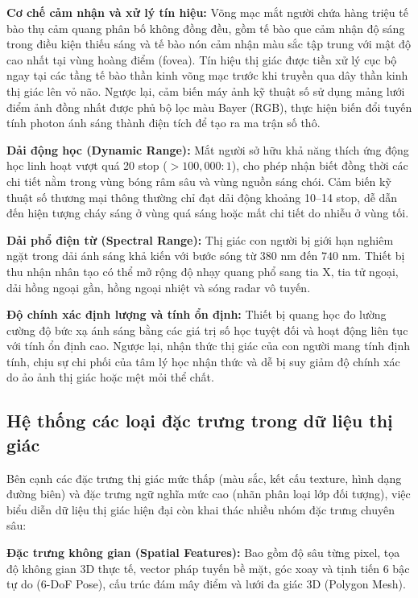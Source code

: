 \textbf{Cơ chế cảm nhận và xử lý tín hiệu:} Võng mạc mắt người chứa hàng triệu tế bào thụ cảm quang phân bố không đồng đều, gồm tế bào que cảm nhận độ sáng trong điều kiện thiếu sáng và tế bào nón cảm nhận màu sắc tập trung với mật độ cao nhất tại vùng hoàng điểm (fovea). Tín hiệu thị giác được tiền xử lý cục bộ ngay tại các tầng tế bào thần kinh võng mạc trước khi truyền qua dây thần kinh thị giác lên vỏ não. Ngược lại, cảm biến máy ảnh kỹ thuật số sử dụng mảng lưới điểm ảnh đồng nhất được phủ bộ lọc màu Bayer (RGB), thực hiện biến đổi tuyến tính photon ánh sáng thành điện tích để tạo ra ma trận số thô.

\textbf{Dải động học (Dynamic Range):} Mắt người sở hữu khả năng thích ứng động học linh hoạt vượt quá 20 stop ($>100,000:1$), cho phép nhận biết đồng thời các chi tiết nằm trong vùng bóng râm sâu và vùng nguồn sáng chói. Cảm biến kỹ thuật số thương mại thông thường chỉ đạt dải động khoảng 10--14 stop, dễ dẫn đến hiện tượng cháy sáng ở vùng quá sáng hoặc mất chi tiết do nhiễu ở vùng tối.

\textbf{Dải phổ điện từ (Spectral Range):} Thị giác con người bị giới hạn nghiêm ngặt trong dải ánh sáng khả kiến với bước sóng từ $380\text{ nm}$ đến $740\text{ nm}$. Thiết bị thu nhận nhân tạo có thể mở rộng độ nhạy quang phổ sang tia X, tia tử ngoại, dải hồng ngoại gần, hồng ngoại nhiệt và sóng radar vô tuyến.

\textbf{Độ chính xác định lượng và tính ổn định:} Thiết bị quang học đo lường cường độ bức xạ ánh sáng bằng các giá trị số học tuyệt đối và hoạt động liên tục với tính ổn định cao. Ngược lại, nhận thức thị giác của con người mang tính định tính, chịu sự chi phối của tâm lý học nhận thức và dễ bị suy giảm độ chính xác do ảo ảnh thị giác hoặc mệt mỏi thể chất.

\subsection{Hệ thống các loại đặc trưng trong dữ liệu thị giác}

Bên cạnh các đặc trưng thị giác mức thấp (màu sắc, kết cấu texture, hình dạng đường biên) và đặc trưng ngữ nghĩa mức cao (nhãn phân loại lớp đối tượng), việc biểu diễn dữ liệu thị giác hiện đại còn khai thác nhiều nhóm đặc trưng chuyên sâu:

\textbf{Đặc trưng không gian (Spatial Features):} Bao gồm độ sâu từng pixel, tọa độ không gian 3D thực tế, vector pháp tuyến bề mặt, góc xoay và tịnh tiến 6 bậc tự do (6-DoF Pose), cấu trúc đám mây điểm và lưới đa giác 3D (Polygon Mesh).


